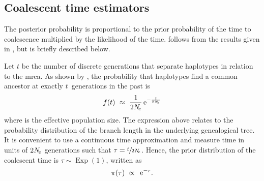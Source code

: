 

%
\subsection{Coalescent time estimators}\label{sec:tmrca_clocks}
%


%
%
%
%


The posterior probability is proportional to the prior probability of the time to coalescence multiplied by the likelihood of the time.
follows from the results given in , but is briefly described below.

Let $t$ be the number of discrete generations that separate  haplotypes in relation to the \gls{mrca}.
As shown by \citet{Tajima:1983bt}, the probability that  haplotypes find a common ancestor at exactly $t$~generations in the past is
\begin{equation}
	f(t) ~\approx~ \frac{1}{2N_{\!e}} \,\mathrm{e}^{-\frac{t}{2N_{\!e}}}
\end{equation}
where \Ne is the effective population size.
The expression above relates to the probability distribution of the branch length in the underlying genealogical tree.
It is convenient to use a continuous time approximation and measure time in units of ${2N_{\!e}}$ generations such that ${\tau = \sfrac{t}{2N_{\!e}}}$.
Hence, the prior distribution of the coalescent time is ${\tau\sim\operatorname{Exp}(1)}$, written as
\begin{equation}
	\pi(\tau) ~\propto~ \,\mathrm{e}^{-\tau}\text{.}
\end{equation}


